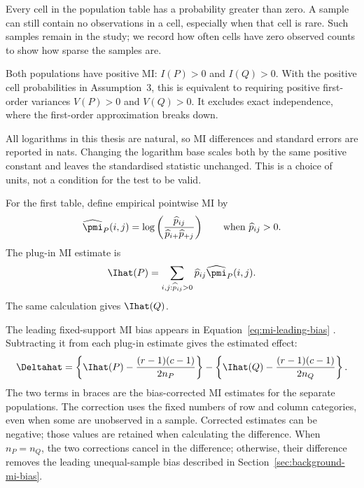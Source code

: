 \begin{assumption}
Every cell in the population table has a probability greater than zero. A
sample can still contain no observations in a cell, especially when that cell
is rare. Such samples remain in the study; we record how often cells have
zero observed counts to show how sparse the samples are.
\end{assumption}

\begin{assumption}[Positive MI]
Both populations have positive MI: \(I(P)>0\) and \(I(Q)>0\). With the positive
cell probabilities in Assumption~3, this is equivalent to requiring positive
first-order variances \(V(P)>0\) and \(V(Q)>0\). It excludes exact
independence, where the first-order approximation breaks down.
\end{assumption}

\begin{assumption}
All logarithms in this thesis are natural, so MI differences and standard
errors are reported in nats. Changing the logarithm base scales both by the
same positive constant and leaves the standardised statistic unchanged.
This is a choice of units, not a condition for the test to be valid.
\end{assumption}

\medskip
{}

For the first table, define empirical pointwise MI by
\begin{equation}
  \widehat\pmi_P(i,j)
  =\log\left(
  \frac{\widehat p_{ij}}
       {\widehat p_{i+}\widehat p_{+j}}
  \right)
  \qquad\text{when }\widehat p_{ij}>0.
  \label{eq:empirical-pmi}
\end{equation}
The plug-in MI estimate is
\begin{equation}
  \Ihat(P)
  =\sum_{i,j:\widehat p_{ij}>0}
  \widehat p_{ij}\widehat\pmi_P(i,j).
  \label{eq:plugin-mi}
\end{equation}
The same calculation gives \(\Ihat(Q)\).

The leading fixed-support MI bias appears in
Equation~\eqref{eq:mi-leading-bias} \citep{moddemeijer1989}. Subtracting it
from each plug-in estimate gives the estimated effect:
\begin{equation}
  \Deltahat
  =\left\{\Ihat(P)-\frac{(r-1)(c-1)}{2n_P}\right\}
  -\left\{\Ihat(Q)-\frac{(r-1)(c-1)}{2n_Q}\right\}.
  \label{eq:bias-corrected-difference}
\end{equation}
The two terms in braces are the bias-corrected MI estimates for the separate
populations.
The correction uses the fixed numbers of row and column categories, even
when some are unobserved in a sample. Corrected estimates can be negative;
those values are retained when calculating the difference.
When \(n_P=n_Q\), the two corrections cancel in the difference;
otherwise, their difference removes the leading unequal-sample bias described
in Section~\ref{sec:background-mi-bias}.

